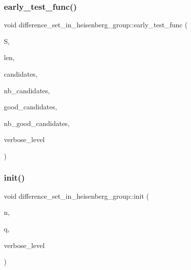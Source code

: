 \subsubsection{\texorpdfstring{early\+\_\+test\+\_\+func()}{early\_test\_func()}}
{\footnotesize\ttfamily void difference\+\_\+set\+\_\+in\+\_\+heisenberg\+\_\+group\+::early\+\_\+test\+\_\+func (\begin{DoxyParamCaption}\item[{\mbox{\hyperlink{galois_8h_a09fddde158a3a20bd2dcadb609de11dc}{I\+NT}} $\ast$}]{S,  }\item[{\mbox{\hyperlink{galois_8h_a09fddde158a3a20bd2dcadb609de11dc}{I\+NT}}}]{len,  }\item[{\mbox{\hyperlink{galois_8h_a09fddde158a3a20bd2dcadb609de11dc}{I\+NT}} $\ast$}]{candidates,  }\item[{\mbox{\hyperlink{galois_8h_a09fddde158a3a20bd2dcadb609de11dc}{I\+NT}}}]{nb\+\_\+candidates,  }\item[{\mbox{\hyperlink{galois_8h_a09fddde158a3a20bd2dcadb609de11dc}{I\+NT}} $\ast$}]{good\+\_\+candidates,  }\item[{\mbox{\hyperlink{galois_8h_a09fddde158a3a20bd2dcadb609de11dc}{I\+NT}} \&}]{nb\+\_\+good\+\_\+candidates,  }\item[{\mbox{\hyperlink{galois_8h_a09fddde158a3a20bd2dcadb609de11dc}{I\+NT}}}]{verbose\+\_\+level }\end{DoxyParamCaption})}

\mbox{\label{classdifference__set__in__heisenberg__group_ab44797f49aa0c8858e79cdb118c0bfd4}} 
\subsubsection{\texorpdfstring{init()}{init()}}
{\footnotesize\ttfamily void difference\+\_\+set\+\_\+in\+\_\+heisenberg\+\_\+group\+::init (\begin{DoxyParamCaption}\item[{\mbox{\hyperlink{galois_8h_a09fddde158a3a20bd2dcadb609de11dc}{I\+NT}}}]{n,  }\item[{\mbox{\hyperlink{galois_8h_a09fddde158a3a20bd2dcadb609de11dc}{I\+NT}}}]{q,  }\item[{\mbox{\hyperlink{galois_8h_a09fddde158a3a20bd2dcadb609de11dc}{I\+NT}}}]{verbose\+\_\+level }\end{DoxyParamCaption})}



